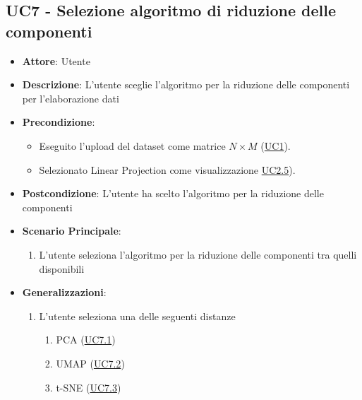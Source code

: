 \subsection{UC7 - Selezione algoritmo di riduzione delle componenti}
    \label{uc7}
    \begin{itemize}
    \item \textbf{Attore}: Utente
    \item \textbf{Descrizione}: L'utente sceglie l'algoritmo per la riduzione delle componenti per l'elaborazione dati
    \item \textbf{Precondizione}: 
    \begin{itemize}
        \item Eseguito l'upload del dataset come matrice $N\times M$ (\hyperref[uc1]{UC1}).
        \item Selezionato Linear Projection come visualizzazione \hyperref[uc2.5]{UC2.5}).
    \end{itemize}  
    \item \textbf{Postcondizione}: L'utente ha scelto l'algoritmo per la riduzione delle componenti
    \item \textbf{Scenario Principale}: 
    \begin{enumerate}
        \item L'utente seleziona l'algoritmo per la riduzione delle componenti tra quelli disponibili
    \end{enumerate}
    \item \textbf{Generalizzazioni}:
        \begin{enumerate}
            \item L'utente seleziona una delle seguenti distanze
                \begin{enumerate}
                    \item PCA (\hyperref[uc7.1]{UC7.1})
                    \item UMAP (\hyperref[uc7.2]{UC7.2})
                    \item t-SNE (\hyperref[uc7.3]{UC7.3})
                \end{enumerate}
        \end{enumerate}  
    \end{itemize}
    
